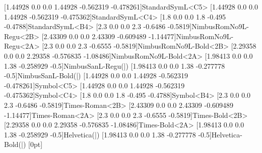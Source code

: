\ifpstGSfonts
  [1.44928 0.0 0.0 1.44928 -0.562319 -0.478261]{StandardSymL}{<C5>}
  [1.44928 0.0 0.0 1.44928 -0.562319 -0.475362]{StandardSymL}{<C4>}
  [1.8 0.0 0.0 1.8 -0.495 -0.4788]{StandardSymL}{<B4>}
  \newpsfontdot{+}[2.3 0.0 0.0 2.3 -0.6486 -0.5819]{NimbusRomNo9L-Regu}{<2B>}
  [2.43309 0.0 0.0 2.43309 -0.609489 -1.14477]{NimbusRomNo9L-Regu}{<2A>}
  [2.3 0.0 0.0 2.3 -0.6555 -0.5819]{NimbusRomNo9L-Bold}{<2B>}
  [2.29358 0.0 0.0 2.29358 -0.576835 -1.08486]{NimbusRomNo9L-Bold}{<2A>}
  \newpsfontdot{|}[1.98413 0.0 0.0 1.38 -0.258929 -0.5]{NimbusSanL-Regu}{(|)}
  [1.98413 0.0 0.0 1.38 -0.277778 -0.5]{NimbusSanL-Bold}{(|)}%
\else
  [1.44928 0.0 0.0 1.44928 -0.562319 -0.478261]{Symbol}{<C5>}
  [1.44928 0.0 0.0 1.44928 -0.562319 -0.475362]{Symbol}{<C4>}
  [1.8 0.0 0.0 1.8 -0.495 -0.4788]{Symbol}{<B4>}
  \newpsfontdot{+}[2.3 0.0 0.0 2.3 -0.6486 -0.5819]{Times-Roman}{<2B>}
  [2.43309 0.0 0.0 2.43309 -0.609489 -1.14477]{Times-Roman}{<2A>}
  [2.3 0.0 0.0 2.3 -0.6555 -0.5819]{Times-Bold}{<2B>}
  [2.29358 0.0 0.0 2.29358 -0.576835 -1.08486]{Times-Bold}{<2A>}
  \newpsfontdot{|}[1.98413 0.0 0.0 1.38 -0.258929 -0.5]{Helvetica}{(|)}
  [1.98413 0.0 0.0 1.38 -0.277778 -0.5]{Helvetica-Bold}{(|)}%
\fi
%
\newdimen\pslinearc
{}[0pt]{\pssetlength{}}
%
\def\psline{\pst@object{psline}}
\def\psline@i{%
  \pst@getarrows{%
    \begin@OpenObj
    \pst@getcoors[\psline@ii
  }%
}
\def\psline@ii{%
  \ifx\pslinestyle\psls@@symbol\addto@pscode{ \psls@symbol SymbolLine }%
  \else
    \addto@pscode{
      \ifPst@noCurrentPoint\else\pst@cp\fi 	  %
      \psline@iii %
      \tx@Line	  %
    }%
  \fi
  \end@OpenObj
}
\def\psline@iii{%
  \ifdim\pslinearc>\z@
    /r \pst@number\pslinearc def
    /Lineto { \tx@Arcto } def
  \else
    /Lineto /lineto load def
  \fi
  \tx@setlinejoin 			%
  \ifshowpoints true \else false \fi
}
%
\def\psLine{\pst@object{psLine}}
\def\psLine@i{%
  \pst@getarrows{%
    \begin@OpenObj
    \psLine@ii}}
\def\psLine@ii(#1){\@ifnextchar({\psLine@iii(#1)}{\psLine@iii(0,0)(#1)}}%
\def\psLine@iii(#1)(#2){%
  \pst@getcoor{#1}\pst@tempA
  \pst@getcoor{#2}\pst@tempB
  \addto@pscode{
    \ifPst@noCurrentPoint\else\pst@cp\fi 	  %
    [ %
    \pst@tempB 
    \pst@tempA  %
    4 copy Pyth2 \psk@arrowlength ge 
      { \psline@iii \tx@Line } 
      { pop pop pop pop pop } ifelse
    }%
  \end@OpenObj
  \ignorespaces
}
